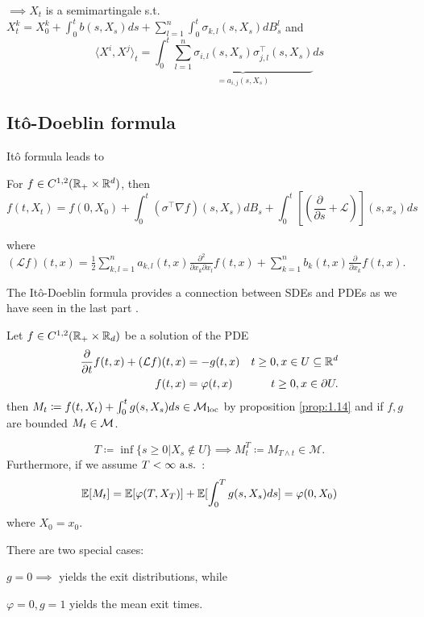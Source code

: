 $ \implies X_t$ is a semimartingale s.t. $X_t^k=X_0^k+\int_0^t b(s,X_s)ds+\sum_{l=1}^n\int_0^t \sigma_{k,l}(s,X_s)dB_s^l$
and \[\langle X^i,X^j\rangle_t=\int_0^t \underbrace{\sum_{l=1}^{n}\sigma_{i,l}(s,X_s)\sigma_{j,l}^\intercal(s,X_s)}_{=a_{i,j}(s,X_s)}ds\]

\subsection{Itô-Doeblin formula}

Itô formula leads to 

\begin{proposition}\label{prop:1.14}
    For $f\in C^{1,2}(\mathbb{R}_+\times\mathbb{R}^d)$, then 
    \[f(t,X_t)=f(0,X_0)+\int_0^t(\sigma^\intercal\nabla f)(s,X_s)dB_s+\int_0^t\left[\left(\frac{\partial}{\partial s}+\mathcal{L}\right)\right](s,x_s)ds\]

    where $(\mathcal{L}f)(t,x)=\frac{1}{2}\sum_{k,l=1}^{n}a_{k,l}(t,x)\frac{\partial^2}{\partial x_k\partial x_l}f(t,x)+\sum_{k=1}^n b_k(t,x)\frac{\partial}{\partial x_k}f(t,x)$.

\end{proposition}

\begin{remark}
   The Itô-Doeblin formula provides a connection between SDEs and PDEs as we 
   have seen in the last part . 
\end{remark}

\begin{example}\label{ex:1.15}
    Let $f\in C^{1,2}(\mathbb{R}_+\times \mathbb{R}_d)$ be a solution of the PDE 
    \begin{align*}
        \frac{\partial}{\partial t}f(t,x)+(\mathcal{L}f)(t,x)&=-g(t,x) & t\geq 0, x\in U\subseteq \mathbb{R}^d\\
        f(t,x)&=\varphi(t,x) & t\geq 0,x\in\partial U.
    \end{align*}
    then $M_t\coloneqq f(t,X_t)+\int_0^t g(s,X_s)ds\in\mathcal{M}_{\text{loc}}$ by proposition \ref{prop:1.14}
    and if $f,g$ are bounded $M_t\in\mathcal{M}$.

    \[T\coloneqq \inf\{s\geq 0|X_s\notin U\}\implies M_t^T\coloneqq M_{T\land t}\in \mathcal{M}.\]
    Furthermore, if we assume $T<\infty\text{ a.s. }$:
    \[\mathbb{E}[M_t]=\mathbb{E}[\varphi(T,X_T)]+\mathbb{E}[\int_0^Tg(s,X_s)ds]=\varphi(0,X_0)\]
    where $X_0=x_0$.

    There are two special cases:

    $g=0\implies$ yields the exit distributions, while 
    
    $\varphi=0,g=1$ yields the mean exit times.
\end{example}

